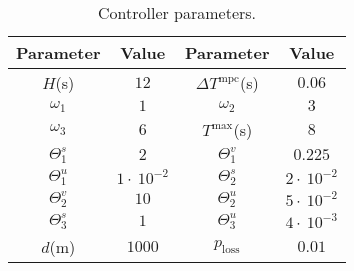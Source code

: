 \documentclass[letterpaper, 10 pt, conference]{ieeeconf}
\theoremstyle{definition}
\theoremstyle{nopoint}
\begin{document}
\begin{center}
	\begin{table}[h!]
		\centering
		\begin{tabular}[t!]{ |c|c|c|c| } 
			\hline
			\textbf{Parameter} & \textbf{Value} & \textbf{Parameter} & \textbf{Value}  \\
			\hline
			$H$(\unit{\second})	& $12$ & $\Delta T^{\mathrm{mpc}}$(\unit{\second}) & $0.06$  \\ 
			$\omega_1$	& $1$ & $\omega_2$ & $3$ \\ 
			$\omega_3$	& $6$ & $T^{\max}$(\unit{\second}) & $8$ \\ 
			$\Theta^s_1$	& $2$ & $\Theta^v_1$ & $0.225$ \\
			$\Theta^u_1$	& $1 \cdot\ {10}^{-2}$ & $\Theta^s_2$ & $2 \cdot\ {10}^{-2}$ \\
			$\Theta^v_2$	& $10$ & $\Theta^u_2$ & $5 \cdot\ {10}^{-2}$ \\
			$\Theta^s_3$	& $1$ & $\Theta^u_3$ & $ 4 \cdot\ {10}^{-3}$ \\
			$d$(\unit{\meter})	& $1000$ & $p_\mathrm{loss}$
			&  $0.01$\\
			\hline
		\end{tabular}
		\caption{Controller parameters.}
		\label{table:controllerParameters}
	\end{table}
\end{center}
\end{document}
